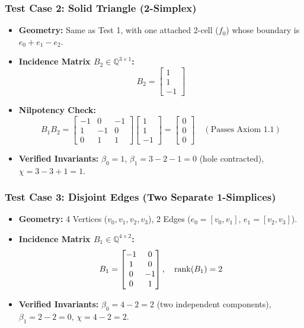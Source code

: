 \subsubsection{Test Case 2: Solid Triangle (2-Simplex)}
\begin{itemize}[leftmargin=1.5cm]
    \item \textbf{Geometry:} Same as Test 1, with one attached 2-cell ($f_0$) whose boundary is $e_0 + e_1 - e_2$.
    \item \textbf{Incidence Matrix $B_2 \in \mathbb{Q}^{3 \times 1}$:}
    \begin{equation}
        B_2 = \begin{bmatrix} 1 \\ 1 \\ -1 \end{bmatrix}
    \end{equation}
    \item \textbf{Nilpotency Check:}
    \begin{equation}
        B_1 B_2 = \begin{bmatrix}
            -1 & 0 & -1 \\
            1 & -1 & 0 \\
            0 & 1 & 1
        \end{bmatrix} \begin{bmatrix} 1 \\ 1 \\ -1 \end{bmatrix} = \begin{bmatrix} 0 \\ 0 \\ 0 \end{bmatrix} \quad (\text{Passes Axiom 1.1})
    \end{equation}
    \item \textbf{Verified Invariants:} $\beta_0 = 1$, $\beta_1 = 3 - 2 - 1 = 0$ (hole contracted), $\chi = 3 - 3 + 1 = 1$.
\end{itemize}

\subsubsection{Test Case 3: Disjoint Edges (Two Separate 1-Simplices)}
\begin{itemize}[leftmargin=1.5cm]
    \item \textbf{Geometry:} 4 Vertices ($v_0, v_1, v_2, v_3$), 2 Edges ($e_0 = [v_0, v_1]$, $e_1 = [v_2, v_3]$).
    \item \textbf{Incidence Matrix $B_1 \in \mathbb{Q}^{4 \times 2}$:}
    \begin{equation}
        B_1 = \begin{bmatrix}
            -1 & 0 \\
            1 & 0 \\
            0 & -1 \\
            0 & 1
        \end{bmatrix}, \quad \operatorname{rank}(B_1) = 2
    \end{equation}
    \item \textbf{Verified Invariants:} $\beta_0 = 4 - 2 = 2$ (two independent components), $\beta_1 = 2 - 2 = 0$, $\chi = 4 - 2 = 2$.
\end{itemize}


